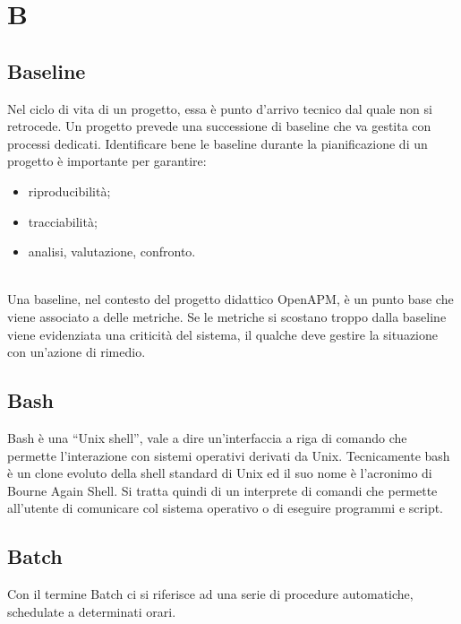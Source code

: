 \section{B}

    \subsection*{Baseline}

        Nel ciclo di vita di un progetto, essa è punto d'arrivo tecnico dal quale non si retrocede. Un progetto prevede una successione
        di baseline che va gestita con processi dedicati. Identificare bene le baseline durante la pianificazione di un progetto è
        importante per garantire:
        \begin{itemize}
        	\item riproducibilità;
        	\item tracciabilità;
        	\item analisi, valutazione, confronto.
        \end{itemize}
        
        \\
        Una baseline, nel contesto del progetto didattico OpenAPM, è un punto base che viene associato a 
        delle metriche. Se le metriche si scostano troppo dalla baseline viene evidenziata una criticità 
        del sistema, il qualche deve gestire la situazione con un'azione di rimedio.

    \subsection*{Bash}

        Bash è una “Unix shell”, vale a dire un'interfaccia a riga di comando che permette l'interazione con sistemi
        operativi derivati da Unix. Tecnicamente bash è un clone evoluto della shell standard di Unix ed il suo nome
        è l'acronimo di Bourne Again Shell. Si tratta quindi di un interprete di comandi che permette all'utente di
        comunicare col sistema operativo o di eseguire programmi e script.

    \subsection*{Batch}

        Con il termine Batch ci si riferisce ad una serie di procedure automatiche, schedulate a determinati orari.
        
